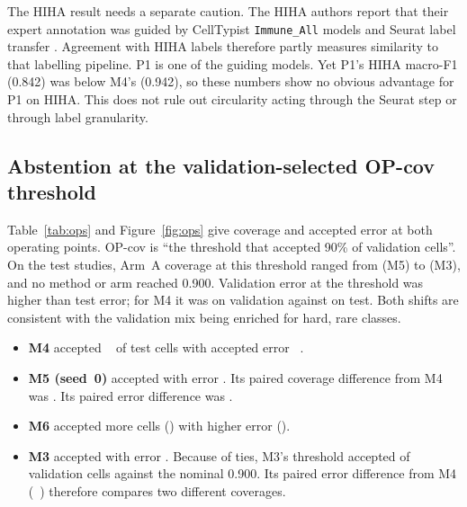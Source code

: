 \documentclass[11pt]{article}
\begin{document}
The HIHA result needs a separate caution. The HIHA authors report that their expert annotation was guided by CellTypist \nolinkurl{Immune_All} models and Seurat label transfer \citep{gong2025hiha}. Agreement with HIHA labels therefore partly measures similarity to that labelling pipeline. P1 is one of the guiding models. Yet P1's HIHA macro-F1 (0.842) was below M4's (0.942), so these numbers show no obvious advantage for P1 on HIHA. This does not rule out circularity acting through the Seurat step or through label granularity.

\subsection{Abstention at the validation-selected OP-cov threshold}

Table~\ref{tab:ops} and Figure~\ref{fig:ops} give coverage and accepted error at both operating points. OP-cov is ``the threshold that accepted 90\% of validation cells''. On the test studies, Arm~A coverage at this threshold ranged from  (M5) to  (M3), and no method or arm reached 0.900. Validation error at the threshold was higher than test error; for M4 it was  on validation against  on test. Both shifts are consistent with the validation mix being enriched for hard, rare classes.

\begin{itemize}
\item \textbf{M4} accepted ~ of test cells with accepted error ~.
\item \textbf{M5 (seed~0)} accepted  with error . Its paired coverage difference from M4 was  . Its paired error difference was  .
\item \textbf{M6} accepted more cells () with higher error ().
\item \textbf{M3} accepted  with error . Because of ties, M3's threshold accepted  of validation cells against the nominal 0.900. Its paired error difference from M4 (~) therefore compares two different coverages.
\end{itemize}
\end{document}
